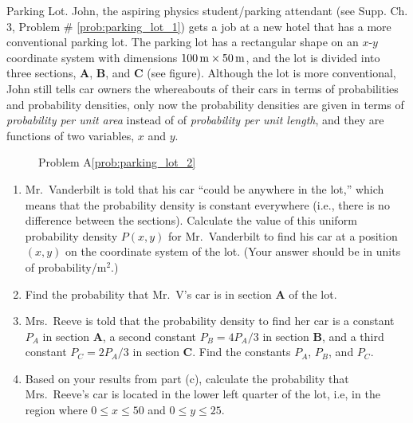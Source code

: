 \begin{aproblem}{ Parking Lot.}  
  John, the aspiring physics student/parking attendant (see
  Supp. Ch. 3, Problem \# \ref{prob:parking_lot_1}) gets a job at a
  new hotel that has a more conventional parking lot.  The parking lot
  has a rectangular shape on an $x$-$y$ coordinate system with
  dimensions $100\,\mbox{m}\times 50\,\mbox{m}$, and the lot is divided
  into three sections, {\bf A}, {\bf B}, and {\bf C} (see figure).
  Although the lot is more conventional, John still tells car owners
  the whereabouts of their cars in terms of probabilities and
  probability densities, only now the probability densities are given
  in terms of {\em probability per unit area} instead of of {\em
    probability per unit length}, and they are functions of two
  variables, $x$ and $y$.
  \label{prob:parking_lot_2}
  \begin{figure}[h]
    \begin{center}
      \caption{Problem A\ref{prob:parking_lot_2}}
    \end{center}
  \end{figure}

  \begin{enumerate}
  \item Mr.~Vanderbilt is told that his car ``could be anywhere in the
    lot,'' which means that the probability density is constant
    everywhere (i.e., there is no difference between the sections).
    Calculate the value of this uniform probability density $P(x,y)$
    for Mr.~Vanderbilt to find his car at a position $(x,y)$ on the
    coordinate system of the lot.  (Your answer should be in units of
    probability/m$^2$.)
  \item Find the probability that Mr.~V's car is in section {\bf A} of
    the lot.
  \item Mrs.~Reeve is told that the probability density to find her
    car is a constant $P_A$ in section {\bf A}, a second constant $P_B
    = 4P_A/3$ in section {\bf B}, and a third constant $P_C = 2P_A/3$
    in section {\bf C}.  Find the constants $P_A$, $P_B$, and $P_C$.
  \item Based on your results from part (c), calculate the probability
    that Mrs.~Reeve's car is located in the lower left quarter of the
    lot, i.e, in the region where $0\leq x\leq 50$ and $0\leq y \leq
    25$.
  \end{enumerate}
\end{aproblem}

